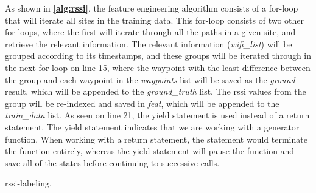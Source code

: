 As shown in \textbf{\autoref{alg:rssi}}, the feature engineering algorithm consists of a for-loop that will iterate all sites in the training data. This for-loop consists of two other for-loops, where the first will iterate through all the paths in a given site, and retrieve the relevant information. %
The relevant information (\textit{wifi\_list}) will be grouped according to its timestamps, and these groups will be iterated through in the next for-loop on line 15, where the waypoint with the least difference between the group and each waypoint in the \textit{waypoints} list will be saved as the \textit{ground} result, which will be appended to the \textit{ground\_truth} list. The \gls{rssi} values from the group will be re-indexed and saved in \textit{feat}, which will be appended to the \textit{train\_data} list. As seen on line 21, the yield statement is used instead of a return statement. The yield statement indicates that we are working with a generator function. When working with a return statement, the statement would terminate the function entirely, whereas the yield statement will pause the function and save all of the states before continuing to successive calls.

\begin{algorithm}[H]
\SetAlgoLined
{}
 \caption{\gls{rssi}-labeling.}
 \label{alg:rssi}
\end{algorithm}

